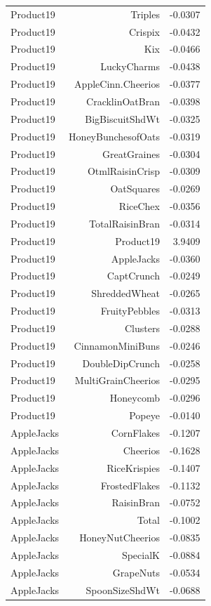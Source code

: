 \begin{longtable}{@{}lrr@{}}
Product19 & Triples & -0.0307 \\
Product19 & Crispix & -0.0432 \\
Product19 & Kix & -0.0466 \\
Product19 & LuckyCharms & -0.0438 \\
Product19 & AppleCinn.Cheerios & -0.0377 \\
Product19 & CracklinOatBran & -0.0398 \\
Product19 & BigBiscuitShdWt & -0.0325 \\
Product19 & HoneyBunchesofOats & -0.0319 \\
Product19 & GreatGraines & -0.0304 \\
Product19 & OtmlRaisinCrisp & -0.0309 \\
Product19 & OatSquares & -0.0269 \\
Product19 & RiceChex & -0.0356 \\
Product19 & TotalRaisinBran & -0.0314 \\
Product19 & Product19 & 3.9409 \\
Product19 & AppleJacks & -0.0360 \\
Product19 & CaptCrunch & -0.0249 \\
Product19 & ShreddedWheat & -0.0265 \\
Product19 & FruityPebbles & -0.0313 \\
Product19 & Clusters & -0.0288 \\
Product19 & CinnamonMiniBuns & -0.0246 \\
Product19 & DoubleDipCrunch & -0.0258 \\
Product19 & MultiGrainCheerios & -0.0295 \\
Product19 & Honeycomb & -0.0296 \\
Product19 & Popeye & -0.0140 \\
AppleJacks & CornFlakes & -0.1207 \\
AppleJacks & Cheerios & -0.1628 \\
AppleJacks & RiceKrispies & -0.1407 \\
AppleJacks & FrostedFlakes & -0.1132 \\
AppleJacks & RaisinBran & -0.0752 \\
AppleJacks & Total & -0.1002 \\
AppleJacks & HoneyNutCheerios & -0.0835 \\
AppleJacks & SpecialK & -0.0884 \\
AppleJacks & GrapeNuts & -0.0534 \\
AppleJacks & SpoonSizeShdWt & -0.0688 \\

\end{longtable}
